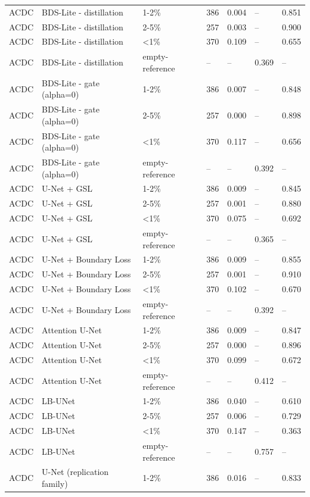 \begin{tabular}{lllllll}
ACDC & BDS-Lite - distillation & 1-2\% & 386 & 0.004 & -- & 0.851 \\
ACDC & BDS-Lite - distillation & 2-5\% & 257 & 0.003 & -- & 0.900 \\
ACDC & BDS-Lite - distillation & <1\% & 370 & 0.109 & -- & 0.655 \\
ACDC & BDS-Lite - distillation & empty-reference & -- & -- & 0.369 & -- \\
ACDC & BDS-Lite - gate (alpha=0) & 1-2\% & 386 & 0.007 & -- & 0.848 \\
ACDC & BDS-Lite - gate (alpha=0) & 2-5\% & 257 & 0.000 & -- & 0.898 \\
ACDC & BDS-Lite - gate (alpha=0) & <1\% & 370 & 0.117 & -- & 0.656 \\
ACDC & BDS-Lite - gate (alpha=0) & empty-reference & -- & -- & 0.392 & -- \\
ACDC & U-Net + GSL & 1-2\% & 386 & 0.009 & -- & 0.845 \\
ACDC & U-Net + GSL & 2-5\% & 257 & 0.001 & -- & 0.880 \\
ACDC & U-Net + GSL & <1\% & 370 & 0.075 & -- & 0.692 \\
ACDC & U-Net + GSL & empty-reference & -- & -- & 0.365 & -- \\
ACDC & U-Net + Boundary Loss & 1-2\% & 386 & 0.009 & -- & 0.855 \\
ACDC & U-Net + Boundary Loss & 2-5\% & 257 & 0.001 & -- & 0.910 \\
ACDC & U-Net + Boundary Loss & <1\% & 370 & 0.102 & -- & 0.670 \\
ACDC & U-Net + Boundary Loss & empty-reference & -- & -- & 0.392 & -- \\
ACDC & Attention U-Net & 1-2\% & 386 & 0.009 & -- & 0.847 \\
ACDC & Attention U-Net & 2-5\% & 257 & 0.000 & -- & 0.896 \\
ACDC & Attention U-Net & <1\% & 370 & 0.099 & -- & 0.672 \\
ACDC & Attention U-Net & empty-reference & -- & -- & 0.412 & -- \\
ACDC & LB-UNet & 1-2\% & 386 & 0.040 & -- & 0.610 \\
ACDC & LB-UNet & 2-5\% & 257 & 0.006 & -- & 0.729 \\
ACDC & LB-UNet & <1\% & 370 & 0.147 & -- & 0.363 \\
ACDC & LB-UNet & empty-reference & -- & -- & 0.757 & -- \\
ACDC & U-Net (replication family) & 1-2\% & 386 & 0.016 & -- & 0.833 \\

\end{tabular}
